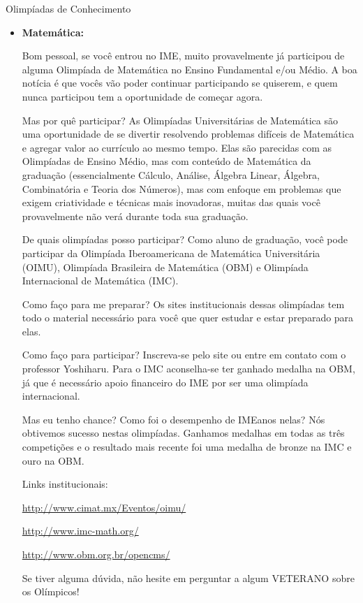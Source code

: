 \begin{subsecao}{Olimpíadas de Conhecimento}

\begin{itemize}

\item{\bf Matemática: }

Bom pessoal, se você entrou no IME, muito provavelmente já participou
de alguma Olimpíada de Matemática no Ensino Fundamental e/ou Médio. A 
boa notícia é que vocês vão poder continuar participando se quiserem,
e quem nunca participou tem a oportunidade de começar agora.

Mas por quê participar? As Olimpíadas Universitárias de Matemática são uma
oportunidade de se divertir resolvendo problemas difíceis de Matemática e agregar
valor ao currículo ao mesmo tempo. Elas são parecidas com as Olimpíadas de
Ensino Médio, mas com conteúdo de Matemática da graduação (essencialmente 
Cálculo, Análise, Álgebra Linear, Álgebra, Combinatória e Teoria dos Números), 
mas com enfoque em problemas que exigem criatividade e técnicas mais inovadoras,
muitas das quais você provavelmente não verá durante toda sua graduação.

De quais olimpíadas posso participar? Como aluno de graduação, você pode
participar da Olimpíada Iberoamericana de Matemática Universitária (OIMU),
Olimpíada Brasileira de Matemática (OBM) e Olimpíada Internacional de 
Matemática (IMC).

Como faço para me preparar? Os sites institucionais dessas olimpíadas
tem todo o material necessário para você que quer estudar e estar preparado
para elas.

Como faço para participar? Inscreva-se pelo site ou entre em contato com
o professor Yoshiharu. Para o IMC aconselha-se ter ganhado medalha na OBM,
já que é necessário apoio financeiro do IME por ser uma olimpíada internacional.

Mas eu tenho chance? Como foi o desempenho de IMEanos nelas? Nós obtivemos
sucesso nestas olimpíadas. Ganhamos medalhas em todas as três competições e
o resultado mais recente foi uma medalha de bronze na IMC e ouro na OBM.

Links institucionais:

\url{http://www.cimat.mx/Eventos/oimu/}

\url{http://www.imc-math.org/}

\url{http://www.obm.org.br/opencms/}

Se tiver alguma dúvida, não hesite em perguntar a algum VETERANO sobre os
Olímpicos!


\end{itemize}
\end{subsecao}
